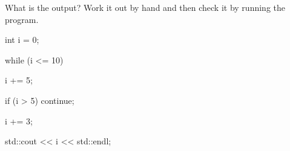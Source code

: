 What is the output? Work it out by hand and then check it by running the program.

\begin{console}

int i = 0;

while (i <= 10)

{     

      i += 5;

      if (i > 5) continue;

      i += 3;

}

std::cout << i << std::endl;

\end{console}

